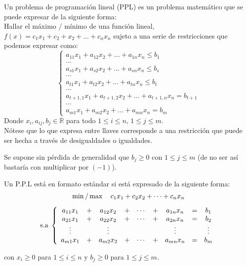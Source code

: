 \begin{definicion}
  Un problema de programación lineal (PPL) es un problema matemático que se puede expresar de la siguiente forma: \\
  Hallar el máximo / mínimo de una función lineal, $f(x)=c_1x_1+c_2+x_2+...+c_nx_n$ sujeto a una serie de restricciones que podemos expresar como:
  \begin{equation*}
    \left\lbrace
      \begin{array}{l}
        a_{11}x_1+a_{12}x_2+...+a_{1n}x_n \leq b_1 \\
        ... \\
        a_{s1}x_1+a_{s2}x_2+...+a_{sn}x_n \leq b_s \\
        ... \\
        a_{t1}x_1+a_{t2}x_2+...+a_{tn}x_n \leq b_t \\
        ... \\
        a_{t+1,1}x_1+a_{t+1,2}x_2+...+a_{t+1,n}x_n = b_{t+1} \\
        ... \\
        a_{m1}x_1+a_{m2}x_2+...+a_{mn}x_n = b_{m}
      \end{array}
    \right.
  \end{equation*}
  Donde $x_i, a_{ij}, b_j \in \mathbb{R}$ para todo $1\leq i \leq n$, $1 \leq j \leq m$. \\
  Nótese que lo que expresa entre llaves corresponde a una restricción que puede ser hecha a través de desigualdades o igualdades.
\end{definicion}

Se supone sin pérdida de generalidad que $b_j\ge0$ con $1\le j\le m$ (de no ser así bastaría con multiplicar por $(-1)$).

\begin{definicion}
  Un P.P.L está en formato estándar si está expresado de la siguiente forma:
  $$
  \begin{array}{c}
    \min/\max \quad c_1x_1+c_2x_2+\dots+c_nx_n \vspace*{0.3cm}\\
    \text{s.a} \; \left\{
    \begin{array}{ccccccccc}
      a_{11}  x_1& + & a_{12}x_2 &+&\cdots&+ & a_{1n} x_n&= & b_1\\
      a_{21}  x_1& + & a_{22}x_2 &+&\cdots&+ & a_{2n} x_n&= & b_2\\
      \vdots&  & \vdots & & & &\vdots &  & \vdots\\
      a_{m1}  x_1& + & a_{m2}x_2 &+&\cdots&+ & a_{mn} x_n&= & b_m\\
    \end{array}
    \right.
  \end{array}
  $$
    
  con $x_i\ge0$ para $1\le i\le n$ y $b_j\ge0$ para $1\le j\le m$.
\end{definicion}


